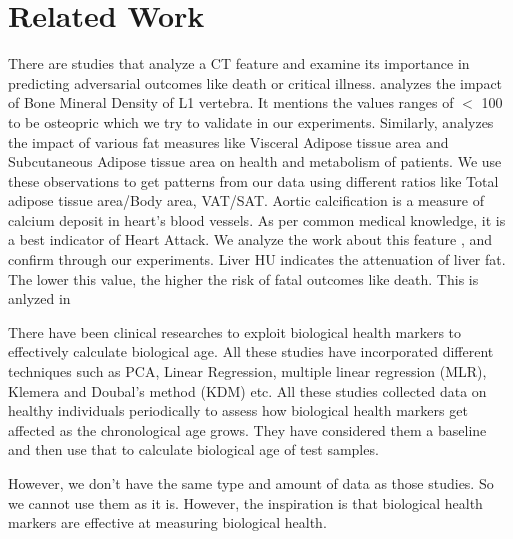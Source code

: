 \section{Related Work}

There are studies that analyze a CT feature and examine its importance in predicting adversarial outcomes like death or critical illness. \cite{BMD}analyzes the impact of Bone Mineral Density of L1 vertebra. It mentions the values ranges of ${<}$ 100 to be osteopric which we try to validate in our experiments. Similarly, \cite{FAT} analyzes the impact of various fat measures like Visceral Adipose tissue area and Subcutaneous Adipose tissue area on health and metabolism of patients. We use these observations to get patterns from our data using different ratios like Total adipose tissue area/Body area, VAT/SAT. 
Aortic calcification is a measure of calcium deposit in heart's blood vessels. As per common medical knowledge, it is a best indicator of Heart Attack. We analyze the work about this feature \cite{AoCa}, and confirm through our experiments. Liver HU indicates the attenuation of liver fat. The lower this value, the higher the risk of fatal outcomes like death. This is anlyzed in \cite{Liver HU}

There have been clinical researches \cite{common_methods_of_biological_age_estimation} \cite{60_new_50} \cite{bio_using_PCA} to exploit biological health markers to effectively calculate biological age. All these studies have incorporated different techniques such as PCA, Linear Regression, multiple linear regression (MLR), Klemera and Doubal’s method (KDM) etc. All these studies collected data on healthy individuals periodically to assess how biological health markers get affected as the chronological age grows. They have considered them a baseline and then use that to calculate biological age of test samples.

However, we don't have the same type and amount of data as those studies. So we cannot use them as it is. However, the inspiration is that biological health markers are effective at measuring biological health.